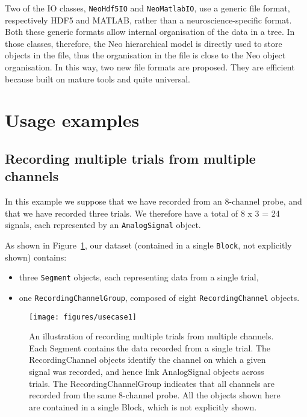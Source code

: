 \documentclass{frontiers}
\begin{document}
Two of the IO classes, \lstinline`NeoHdf5IO` and \lstinline`NeoMatlabIO`, use a generic file format, respectively HDF5 and MATLAB, rather than a neuroscience-specific format. Both these generic formats allow internal organisation of the data in a tree. In those classes, therefore, the Neo hierarchical model is directly used to store objects in the file, thus the organisation in the file is close to the Neo object organisation. In this way, two new file formats are proposed. They are efficient because built on mature tools and quite universal.


\section{Usage examples}

\subsection{Recording multiple trials from multiple channels}


In this example we suppose that we have recorded from an 8-channel probe, and that we have recorded three trials. We therefore have a total of 8 x 3 = 24 signals, each represented by an \lstinline`AnalogSignal` object.

As shown in Figure~\ref{fig:usecase1}, our dataset (contained in a single \lstinline`Block`, not explicitly shown) contains:
\begin{itemize}
\item three \lstinline`Segment` objects, each representing data from a single trial,
\item one \lstinline`RecordingChannelGroup`, composed of eight \lstinline`RecordingChannel` objects.
\end{itemize}

\begin{figure}
\centering
\texttt{[image: figures/usecase1]}
\caption{An illustration of recording multiple trials from multiple channels.  Each Segment contains the data recorded from a single trial. The RecordingChannel objects identify the channel on which a given signal was recorded, and hence link AnalogSignal objects across trials. The RecordingChannelGroup indicates that all channels are recorded from the same 8-channel probe. All the objects shown here are contained in a single Block, which is not explicitly shown.}\label{fig:usecase1} 
\end{figure}
\end{document}
